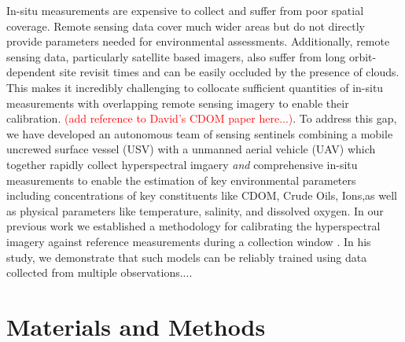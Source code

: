 \documentclass[journal,article,submit,pdftex,moreauthors]{Definitions/mdpi}
\begin{document}
In-situ measurements are expensive to collect and suffer from poor spatial coverage. Remote sensing data cover much wider areas but do not directly provide parameters needed for environmental assessments. Additionally, remote sensing data, particularly satellite based imagers, also suffer from long orbit-dependent site revisit times and can be easily occluded by the presence of clouds. This makes it incredibly challenging to collocate sufficient quantities of in-situ measurements with overlapping remote sensing imagery to enable their calibration. \textcolor{red}{(add reference to David's CDOM paper here...)}. To address this gap, we have developed an autonomous team of sensing sentinels combining a mobile uncrewed surface vessel (USV) with a unmanned aerial vehicle (UAV) which together rapidly collect hyperspectral imgaery \textit{and} comprehensive in-situ measurements to enable the estimation of key environmental parameters including concentrations of key constituents like CDOM, Crude Oils, Ions,as well as physical parameters like temperature, salinity, and dissolved oxygen. In our previous work we established a methodology for calibrating the hyperspectral imagery against reference measurements during a collection window \cite{robotTeam1}. In his study, we demonstrate that such models can be reliably trained using data collected from multiple observations....  



\section{Materials and Methods}
\end{document}
